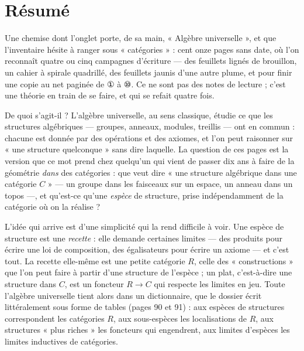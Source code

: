\documentclass[11pt,a4paper]{article}
\begin{document}
\section*{Résumé}

\begin{resume}
Une chemise dont l'onglet porte, de sa main, « Algèbre universelle », et
que l'inventaire hésite à ranger sous « catégories » : cent onze pages sans
date, où l'on reconnaît quatre ou cinq campagnes d'écriture — des feuillets
lignés de brouillon, un cahier à spirale quadrillé, des feuillets jaunis
d'une autre plume, et pour finir une copie au net paginée de ① à ⑩. Ce ne
sont pas des notes de lecture ; c'est une théorie en train de se faire, et
qui se refait quatre fois.

De quoi s'agit-il ? L'algèbre universelle, au sens classique, étudie ce que
les structures algébriques — groupes, anneaux, modules, treillis — ont en
commun : chacune est donnée par des opérations et des axiomes, et l'on peut
raisonner sur « une structure quelconque » sans dire laquelle. La question
de ces pages est la version que ce mot prend chez quelqu'un qui vient de
passer dix ans à faire de la géométrie \emph{dans} des catégories : que
veut dire « une structure algébrique dans une catégorie $C$ » — un groupe
dans les faisceaux sur un espace, un anneau dans un topos —, et qu'est-ce
qu'une \emph{espèce} de structure, prise indépendamment de la catégorie où
on la réalise ?

L'idée qui arrive est d'une simplicité qui la rend difficile à voir. Une
espèce de structure est une \emph{recette} : elle demande certaines
limites — des produits pour écrire une loi de composition, des égalisateurs
pour écrire un axiome — et c'est tout. La recette elle-même est une petite
catégorie $R$, celle des « constructions » que l'on peut faire à partir
d'une structure de l'espèce ; un plat, c'est-à-dire une structure dans $C$,
est un foncteur $R \to C$ qui respecte les limites en jeu. Toute l'algèbre
universelle tient alors dans un dictionnaire, que le dossier écrit
littéralement sous forme de tables (pages 90 et 91) : aux espèces de
structures correspondent les catégories $R$, aux sous-espèces les
localisations de $R$, aux structures « plus riches » les foncteurs qui
engendrent, aux limites d'espèces les limites inductives de catégories.


\end{resume}
\end{document}
